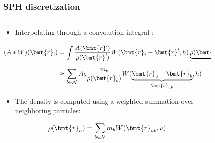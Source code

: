 \begin{frame}
    \frametitle{SPH discretization}

    \begin{columns}[T] %
        \begin{column}{.6\textwidth}
            \begin{itemize}
                \item Interpolating through a convolution integral \cite{Price2012}:
            \end{itemize}
            \begin{align}
                (A * W)(\bmt{r}_i) & =
                \int \frac{A(\bmt{r}')}{\rho (\bmt{r}')} W(\bmt{r}_i-\bmt{r}', h)
                \underbrace{\rho (\bmt{r}')\mathrm{d}\bmt{r}'}_{\mathrm{d}m'}
                \\
                                   & \approx \sum_{b \in \mathcal{N}} A_b \frac{m_b}{\rho
                    (\bmt{r}_b)}
                W(\underbrace{\bmt{r}_a-\bmt{r}_b}_{\bmt{r}_{ab}}, h)
            \end{align}
            \begin{itemize}
                \item The density is computed using a weighted summation over neighboring
                      particles:
            \end{itemize}
            \begin{align}
                \rho(\bmt{r}_a) =  \sum_{b \in \mathcal{N}} m_b W(\bmt{r}_{ab}, h)
            \end{align}
        \end{column}
        \hfill
        \begin{column}{.3\textwidth}
            \begin{figure}[h]
                \centering
                \def\svgwidth{\textwidth}
                
                \label{fig: integral to sum}
            \end{figure}
            \begin{figure}[b!]
                \centering
                \def\svgwidth{0.7\textwidth}
                
                \label{fig: density calculation}
            \end{figure}
        \end{column}
    \end{columns}

\end{frame}

